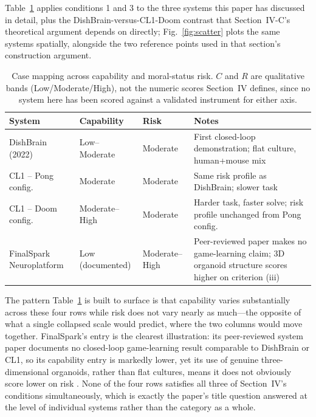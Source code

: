 \documentclass[journal]{IEEEtran}
\begin{document}
Table~\ref{tab:mapping} applies conditions 1 and 3 to the three systems this paper
has discussed in detail, plus the DishBrain-versus-CL1-Doom contrast that
Section~IV-C's theoretical argument depends on directly; Fig.~\ref{fig:scatter} plots
the same systems spatially, alongside the two reference points used in that
section's construction argument.

\begin{table}[!t]
\centering
\caption{Case mapping across capability and moral-status risk. $C$ and $R$ are
qualitative bands (Low/Moderate/High), not the numeric scores Section~IV defines,
since no system here has been scored against a validated instrument for either
axis.}
\label{tab:mapping}
\begin{tabular}{@{}p{1.6cm}p{1.7cm}p{1.6cm}p{2.7cm}@{}}
\toprule
\textbf{System} & \textbf{Capability} & \textbf{Risk} & \textbf{Notes} \\
\midrule
DishBrain (2022) & Low--Moderate & Moderate & First closed-loop demonstration; flat
culture, human+mouse mix \cite{kagan2022dishbrain} \\
CL1 -- Pong config. & Moderate & Moderate & Same risk profile as DishBrain; slower
task \cite{corticallabs2025cl1} \\
CL1 -- Doom config. & Moderate--High & Moderate & Harder task, faster solve; risk
profile unchanged from Pong config. \cite{corticallabs2026doom} \\
FinalSpark Neuroplatform & Low (documented) & Moderate--High & Peer-reviewed paper
makes no game-learning claim; 3D organoid structure scores higher on
criterion (iii) \cite{jordan2024open} \\
\bottomrule
\end{tabular}
\end{table}

The pattern Table~\ref{tab:mapping} is built to surface is that capability varies
substantially across these four rows while risk does not vary nearly as much---the
opposite of what a single collapsed scale would predict, where the two columns would
move together. FinalSpark's entry is the clearest illustration: its peer-reviewed
system paper documents no closed-loop game-learning result comparable to DishBrain
or CL1, so its capability entry is markedly lower, yet its use of genuine
three-dimensional organoids, rather than flat cultures, means it does not obviously
score lower on risk \cite{jordan2024open}. None of the four rows satisfies all three
of Section~IV's conditions simultaneously, which is exactly the paper's title
question answered at the level of individual systems rather than the category as a
whole.
\end{document}

